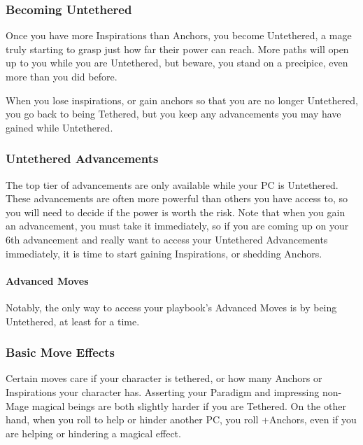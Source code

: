 \documentclass[
]{article}
\begin{document}
\hypertarget{becoming-untethered}{%
\subsubsection{Becoming Untethered}\label{becoming-untethered}}

Once you have more Inspirations than Anchors, you become Untethered, a
mage truly starting to grasp just how far their power can reach. More
paths will open up to you while you are Untethered, but beware, you
stand on a precipice, even more than you did before.

When you lose inspirations, or gain anchors so that you are no longer
Untethered, you go back to being Tethered, but you keep any advancements
you may have gained while Untethered.

\hypertarget{untethered-advancements}{%
\subsubsection{Untethered Advancements}\label{untethered-advancements}}

The top tier of advancements are only available while your PC is
Untethered. These advancements are often more powerful than others you
have access to, so you will need to decide if the power is worth the
risk. Note that when you gain an advancement, you must take it
immediately, so if you are coming up on your 6th advancement and really
want to access your Untethered Advancements immediately, it is time to
start gaining Inspirations, or shedding Anchors.

\hypertarget{advanced-moves}{%
\paragraph{Advanced Moves}\label{advanced-moves}}

Notably, the only way to access your playbook's Advanced Moves is by
being Untethered, at least for a time.

\hypertarget{basic-move-effects}{%
\subsubsection{Basic Move Effects}\label{basic-move-effects}}

Certain moves care if your character is tethered, or how many Anchors or
Inspirations your character has. Asserting your Paradigm and impressing
non-Mage magical beings are both slightly harder if you are Tethered. On
the other hand, when you roll to help or hinder another PC, you roll
+Anchors, even if you are helping or hindering a magical effect.
\end{document}

